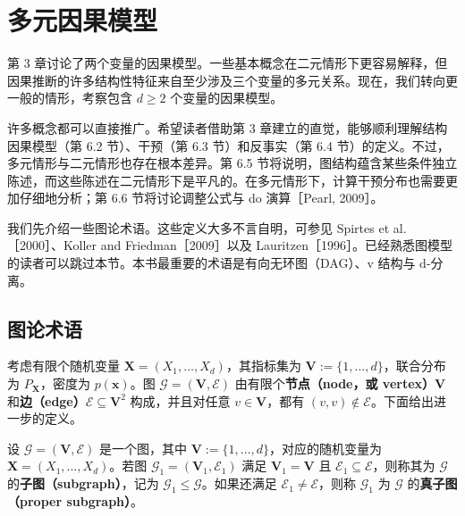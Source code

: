 \chapter{多元因果模型}
\label{ch:multivariate-models}
\providecommand{\CH}{\mathrm{CH}}

第 3 章讨论了两个变量的因果模型。一些基本概念在二元情形下更容易解释，但因果推断的许多结构性特征来自至少涉及三个变量的多元关系。现在，我们转向更一般的情形，考察包含 $d\ge2$ 个变量的因果模型。

许多概念都可以直接推广。希望读者借助第 3 章建立的直觉，能够顺利理解结构因果模型（第 6.2 节）、干预（第 6.3 节）和反事实（第 6.4 节）的定义。不过，多元情形与二元情形也存在根本差异。第 6.5 节将说明，图结构蕴含某些条件独立陈述，而这些陈述在二元情形下是平凡的。在多元情形下，计算干预分布也需要更加仔细地分析；第 6.6 节将讨论调整公式与 do 演算［Pearl, 2009］。

我们先介绍一些图论术语。这些定义大多不言自明，可参见 Spirtes et al.［2000］、Koller and Friedman［2009］以及 Lauritzen［1996］。已经熟悉图模型的读者可以跳过本节。本书最重要的术语是有向无环图（DAG）、v 结构与 d-分离。

\section{图论术语}
\label{sec:ch06-graphs}

考虑有限个随机变量 $\mathbf X=(X_1,\ldots,X_d)$，其指标集为 $\mathbf V:=\{1,\ldots,d\}$，联合分布为 $P_{\mathbf X}$，密度为 $p(\mathbf x)$。图 $\mathcal G=(\mathbf V,\mathcal E)$ 由有限个\textbf{节点（node，或 vertex）}$\mathbf V$ 和\textbf{边（edge）}$\mathcal E\subseteq\mathbf V^2$ 构成，并且对任意 $v\in\mathbf V$，都有 $(v,v)\notin\mathcal E$。下面给出进一步的定义。

设 $\mathcal G=(\mathbf V,\mathcal E)$ 是一个图，其中 $\mathbf V:=\{1,\ldots,d\}$，对应的随机变量为 $\mathbf X=(X_1,\ldots,X_d)$。若图 $\mathcal G_1=(\mathbf V_1,\mathcal E_1)$ 满足 $\mathbf V_1=\mathbf V$ 且 $\mathcal E_1\subseteq\mathcal E$，则称其为 $\mathcal G$ 的\textbf{子图（subgraph）}，记为 $\mathcal G_1\le\mathcal G$。如果还满足 $\mathcal E_1\ne\mathcal E$，则称 $\mathcal G_1$ 为 $\mathcal G$ 的\textbf{真子图（proper subgraph）}。

